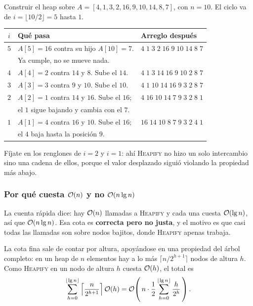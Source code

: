 \documentclass[11pt,letterpaper]{article}
\begin{document}
\begin{ejemplo}
  Construir el heap sobre $A = [4, 1, 3, 2, 16, 9, 10, 14, 8, 7]$,
  con $n = 10$. El ciclo va de $i = \lfloor 10/2 \rfloor = 5$ hasta
  $1$.

  \begin{center}
  \begin{tabular}{cll}
    \toprule
    \textbf{$i$} & \textbf{Qué pasa}
      & \textbf{Arreglo después} \\
    \midrule
    $5$ & $A[5] = 16$ contra su hijo $A[10] = 7$.
        & $4\;1\;3\;2\;16\;9\;10\;14\;8\;7$ \\
        & Ya cumple, no se mueve nada. & \\
    \addlinespace
    $4$ & $A[4] = 2$ contra $14$ y $8$. Sube el $14$.
        & $4\;1\;3\;14\;16\;9\;10\;2\;8\;7$ \\
    \addlinespace
    $3$ & $A[3] = 3$ contra $9$ y $10$. Sube el $10$.
        & $4\;1\;10\;14\;16\;9\;3\;2\;8\;7$ \\
    \addlinespace
    $2$ & $A[2] = 1$ contra $14$ y $16$. Sube el $16$;
        & $4\;16\;10\;14\;7\;9\;3\;2\;8\;1$ \\
        & el $1$ sigue bajando y cambia con el $7$. & \\
    \addlinespace
    $1$ & $A[1] = 4$ contra $16$ y $10$. Sube el $16$;
        & $16\;14\;10\;8\;7\;9\;3\;2\;4\;1$ \\
        & el $4$ baja hasta la posición $9$. & \\
    \bottomrule
  \end{tabular}
  \end{center}

  Fíjate en los renglones de $i = 2$ y $i = 1$: ahí
  \textsc{Heapify} no hizo un solo intercambio sino una cadena de
  ellos, porque el valor desplazado siguió violando la propiedad más
  abajo.
\end{ejemplo}

\subsubsection*{Por qué cuesta $\mathcal{O}\!\left(n\right)$ y no $\mathcal{O}\!\left(n \lg n\right)$}

La cuenta rápida dice: hay $\mathcal{O}\!\left(n\right)$ llamadas a \textsc{Heapify} y
cada una cuesta $\mathcal{O}\!\left(\lg n\right)$, así que $\mathcal{O}\!\left(n \lg n\right)$. Esa cota es
\textbf{correcta pero no justa}, y el motivo es que casi todas las
llamadas son sobre nodos bajitos, donde \textsc{Heapify} apenas
trabaja.

La cota fina sale de contar por altura, apoyándose en una propiedad
del árbol completo: en un heap de $n$ elementos hay a lo más
$\lceil n/2^{h+1} \rceil$ nodos de altura $h$. Como
\textsc{Heapify} en un nodo de altura $h$ cuesta $\mathcal{O}\!\left(h\right)$, el total
es
\[
    \sum_{h=0}^{\lfloor \lg n \rfloor}
    \left\lceil \frac{n}{2^{h+1}} \right\rceil \mathcal{O}\!\left(h\right)
    = \mathcal{O}\!\left(\, n \cdot \frac{1}{2}
      \sum_{h=0}^{\lfloor \lg n \rfloor} \frac{h}{2^{h}} \,\right) .
\]
\end{document}

